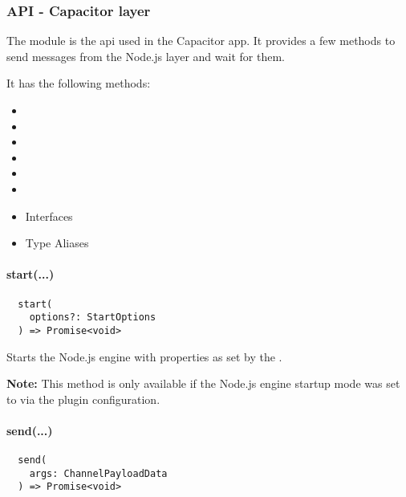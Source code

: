\subsubsection{API - Capacitor layer}
\label{sec:Capacitor-NodeJS:API_CapacitorLayer}

The  module is the \ac{api} used in the Capacitor app.
It provides a few methods to send messages from the Node.js layer and wait for them.

It has the following methods:

\begin{itemize}
  \setlength\itemsep{-0.8em}
  \item {}
  \item {}
  \item {}
  \item {}
  \item {}
  \item {}
  \item Interfaces
  \item Type Aliases
\end{itemize}


\paragraph{start(...)}

\begin{verbatim}
  start(
    options?: StartOptions
  ) => Promise<void>
\end{verbatim}

Starts the Node.js engine with properties as set by the .

\textbf{Note:} This method is only available if the Node.js engine startup mode was set to  via the plugin configuration.


\paragraph{send(...)}

\begin{verbatim}
  send(
    args: ChannelPayloadData
  ) => Promise<void>
\end{verbatim}

